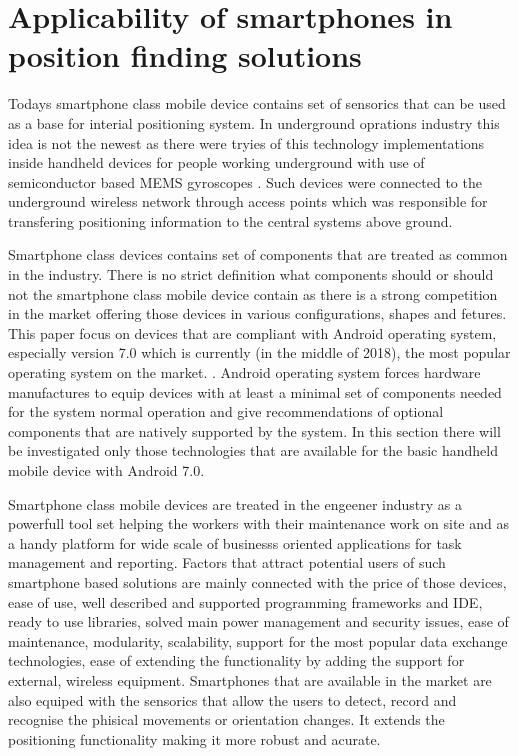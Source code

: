 \documentclass[../main.tex]{subfiles}
\begin{document}
\section{Applicability of smartphones in position finding solutions} %
\label{sec:mobile_device_dedicated_positioning_systems}

Todays smartphone class mobile device contains set of sensorics that can be used as a base for interial positioning system. In underground oprations industry this idea is not the newest as there were tryies of this technology implementations inside handheld devices for people working underground with use of semiconductor based MEMS gyroscopes \cite{Thesis_CM}. Such devices were connected to the underground wireless network through access points which was responsible for transfering positioning information to the central systems above ground.

Smartphone class devices contains set of components that are treated as common in the industry. There is no strict definition what components should or should not the smartphone class mobile device contain as there is a strong competition in the market offering those devices in various configurations, shapes and fetures. This paper focus on devices that are compliant with Android operating system, especially version 7.0 which is currently (in the middle of 2018), the most popular operating system on the market. \cite{android7.0_cdd}. Android operating system forces hardware manufactures to equip devices with at least a minimal set of components needed for the system normal operation and give recommendations of optional components that are natively supported by the system\cite{android7.0_cdd}. In this section there will be investigated only those technologies that are available for the basic handheld mobile device with Android 7.0.

Smartphone class mobile devices are treated in the engeener industry as a powerfull tool set helping the workers with their maintenance work on site and as a handy platform for wide scale of businesss oriented applications for task management and reporting. Factors that attract potential users of such smartphone based solutions are mainly connected with the price of those devices, ease of use, well described and supported programming frameworks and IDE, ready to use libraries, solved main power management and security issues, ease of maintenance, modularity, scalability, support for the most popular data exchange technologies, ease of extending the functionality by adding the support for external, wireless equipment. Smartphones that are available in the market are also equiped with the sensorics that allow the users to detect, record and recognise the phisical movements or orientation changes. It extends the positioning functionality making it more robust and acurate.
\end{document}
